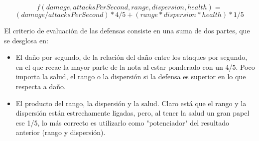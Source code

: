 $$ f(damage, attacksPerSecond, range, dispersion, health)= $$ $$(damage/attacksPerSecond)*4/5 + (range*dispersion*health)*1/5$$

El criterio de evaluación de las defensas consiste en una suma de dos partes, que se desglosa en:
\begin{itemize}
\item El daño por segundo, de la relación del daño entre los ataques por segundo, en el que recae la mayor parte de la nota al estar ponderado con un 4/5. 
Poco importa la salud, el rango o la dispersión si la defensa es superior en lo que respecta a daño.
\item El producto del rango, la dispersión y la salud. Claro está que el rango y la dispersión están estrechamente ligadas, pero, al tener la salud un gran papel 
ese 1/5, lo más correcto es utilizarlo como "potenciador" del resultado anterior (rango y dispersión).
\end{itemize}
